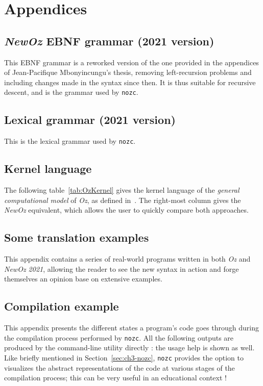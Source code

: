 \appendix
\chapter*{Appendices}
\renewcommand{\thesection}{\Alph{section}}

\section{\textit{NewOz} EBNF grammar (2021 version)}\label{sec:appendix-grammar}
This EBNF grammar is a reworked version of the one provided in the appendices of Jean-Pacifique Mbonyincungu's thesis,
removing left-recursion problems and including changes made in the syntax since then.
It is thus suitable for recursive descent, and is the grammar used by \texttt{nozc}.


\section{Lexical grammar (2021 version)}\label{sec:appendix-lexical-grammar}
This is the lexical grammar used by \texttt{nozc}.


\section{Kernel language}\label{sec:appendix-kernel}
The following table~\ref{tab:OzKernel} gives the kernel language of the \textit{general computational model} of \textit{Oz}, as defined in~\cite{van2004concepts}.
The right-most column gives the \textit{NewOz} equivalent, which allows the user to quickly compare both approaches.


\section{Some translation examples}\label{sec:appendix-examples}
This appendix contains a series of real-world programs written in both \textit{Oz} and \textit{NewOz 2021}, allowing the reader to see the new syntax in action and forge themselves an opinion base on extensive examples.







\section{Compilation example}\label{sec:appendix-compilation}
This appendix presents the different states a program's code goes through during the compilation process performed by \texttt{nozc}.
All the following outputs are produced by the command-line utility directly : the usage help is shown as well.
Like briefly mentioned in Section~\ref{sec:ch3-nozc}, \texttt{nozc} provides the option to visualizes the abstract representations of the code at various stages of the compilation process;
this can be very useful in an educational context !



